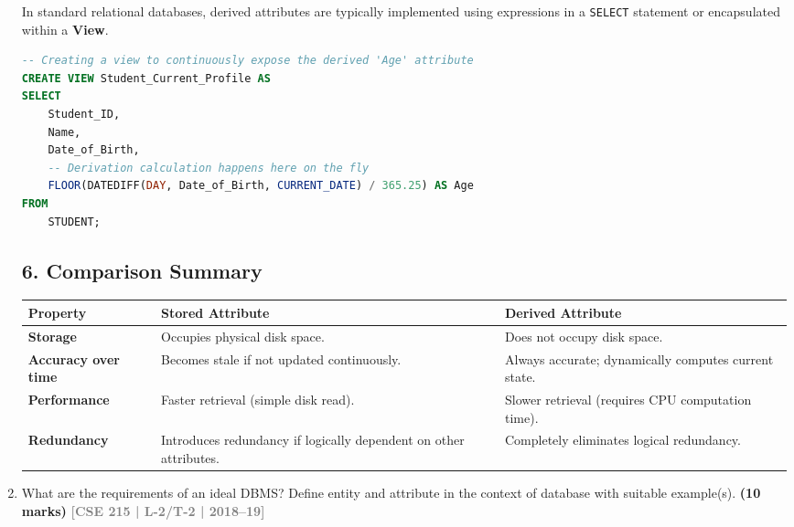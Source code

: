 \documentclass[12pt,a3paper]{article}
\newcommand{\yr}[1]{\hfill\textcolor{gray}{\small\textbf{[#1]}}}
\newcommand{\mk}[1]{\textcolor{orange!70!black}{\small\textbf{(#1 marks)}}}
\begin{document}
\begin{enumerate}
\begin{tcolorbox}[enhanced,breakable,ansbox,colback=cA!4,colframe=cA,boxrule=0.8pt,arc=5pt,title={\textbf{Answer}},fonttitle=\bfseries\color{white},colbacktitle=cA]
In standard relational databases, derived attributes are typically implemented using expressions in a \texttt{SELECT} statement or encapsulated within a \textbf{View}.

\begin{lstlisting}[language=SQL]
-- Creating a view to continuously expose the derived 'Age' attribute
CREATE VIEW Student_Current_Profile AS
SELECT 
    Student_ID,
    Name,
    Date_of_Birth,
    -- Derivation calculation happens here on the fly
    FLOOR(DATEDIFF(DAY, Date_of_Birth, CURRENT_DATE) / 365.25) AS Age
FROM 
    STUDENT;
\end{lstlisting}

\subsection*{6. Comparison Summary}

\begin{center}
\renewcommand{\arraystretch}{1.4}
\begin{tabularx}{\textwidth}{@{} l X X @{}}
\toprule
\textbf{Property} & \textbf{Stored Attribute} & \textbf{Derived Attribute} \\
\midrule
\textbf{Storage} & Occupies physical disk space. & Does not occupy disk space. \\
\textbf{Accuracy over time} & Becomes stale if not updated continuously. & Always accurate; dynamically computes current state. \\
\textbf{Performance} & Faster retrieval (simple disk read). & Slower retrieval (requires CPU computation time). \\
\textbf{Redundancy} & Introduces redundancy if logically dependent on other attributes. & Completely eliminates logical redundancy. \\
\bottomrule
\end{tabularx}
\end{center}

\end{tcolorbox}

\item What are the requirements of an ideal DBMS? Define entity and attribute in the context of database with suitable example(s).
\mk{10} \yr{CSE 215 | L-2/T-2 | 2018--19}

\begin{tcolorbox}[enhanced,breakable,ansbox,colback=cA!4,colframe=cA,boxrule=0.8pt,arc=5pt,title={\textbf{Answer}},fonttitle=\bfseries\color{white},colbacktitle=cA]


\end{tcolorbox}
\end{enumerate}
\end{document}
